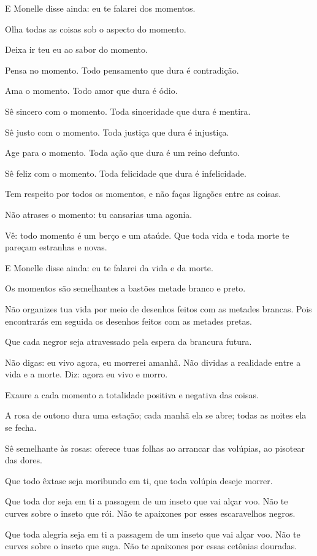 E Monelle disse ainda: eu te falarei dos momentos.

Olha todas as coisas sob o aspecto do momento.

Deixa ir teu eu ao sabor do momento.

Pensa no momento. Todo pensamento que dura é contradição.

Ama o momento. Todo amor que dura é ódio.

Sê sincero com o momento. Toda sinceridade que dura é mentira.

Sê justo com o momento. Toda justiça que dura é injustiça.

Age para o momento. Toda ação que dura é um reino defunto.

Sê feliz com o momento. Toda felicidade que dura é infelicidade.

Tem respeito por todos os momentos, e não faças ligações entre as
coisas.

Não atrases o momento: tu cansarias uma agonia.

Vê: todo momento é um berço e um ataúde. Que toda vida e toda morte te
pareçam estranhas e novas.

E Monelle disse ainda: eu te falarei da vida e da morte.

Os momentos são semelhantes a bastões metade branco e preto.

Não organizes tua vida por meio de desenhos feitos com as metades
brancas. Pois encontrarás em seguida os desenhos feitos com as metades
pretas.

Que cada negror seja atravessado pela espera da brancura futura.

Não digas: eu vivo agora, eu morrerei amanhã. Não dividas a realidade
entre a vida e a morte. Diz: agora eu vivo e morro.

Exaure a cada momento a totalidade positiva e negativa das coisas.

A rosa de outono dura uma estação; cada manhã ela se abre; todas as
noites ela se fecha.

Sê semelhante às rosas: oferece tuas folhas ao arrancar das volúpias,
ao pisotear das dores.

Que todo êxtase seja moribundo em ti, que toda volúpia deseje morrer.

Que toda dor seja em ti a passagem de um inseto que vai alçar voo. Não
te curves sobre o inseto que rói. Não te apaixones por esses escaravelhos
negros.

Que toda alegria seja em ti a passagem de um inseto que vai alçar voo.
Não te curves sobre o inseto que suga. Não te apaixones por essas cetônias
douradas.

